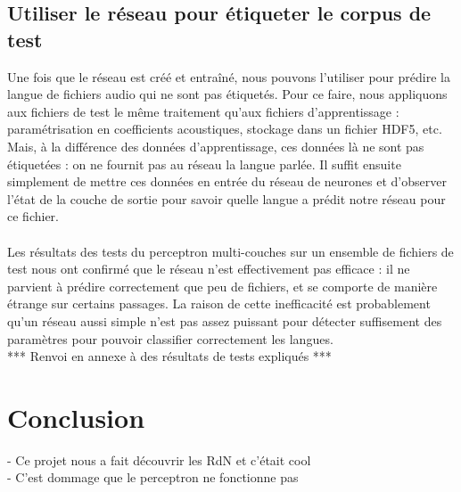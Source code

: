 \documentclass{article}
\begin{document}
\subsection{Utiliser le réseau pour étiqueter le corpus de test}

Une fois que le réseau est créé et entraîné, nous pouvons l'utiliser pour prédire la langue de fichiers audio qui ne sont pas étiquetés. Pour ce faire, nous appliquons aux fichiers de test le même traitement qu'aux fichiers d'apprentissage : paramétrisation en coefficients acoustiques, stockage dans un fichier HDF5, etc. Mais, à la différence des données d'apprentissage, ces données là ne sont pas étiquetées : on ne fournit pas au réseau la langue parlée. Il suffit ensuite simplement de mettre ces données en entrée du réseau de neurones et d'observer l'état de la couche de sortie pour savoir quelle langue a prédit notre réseau pour ce fichier.\\
 \\
Les résultats des tests du perceptron multi-couches sur un ensemble de fichiers de test nous ont confirmé que le réseau n'est effectivement pas efficace : il ne parvient à prédire correctement que peu de fichiers, et se comporte de manière étrange sur certains passages. La raison de cette inefficacité est probablement qu'un réseau aussi simple n'est pas assez puissant pour détecter suffisement des paramètres pour pouvoir classifier correctement les langues.\\ *** Renvoi en annexe à des résultats de tests expliqués ***\\

\section{Conclusion}

- Ce projet nous a fait découvrir les RdN et c'était cool\\
- C'est dommage que le perceptron ne fonctionne pas



\end{document}
